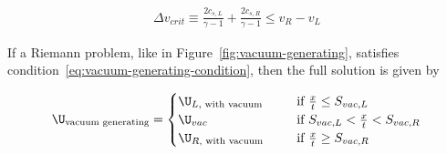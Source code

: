 \begin{align}
    \Delta v_{crit} \equiv \frac{2 c_{s,L}}{\gamma - 1 } + \frac{2 c_{s,R}}{\gamma - 1 } \leq v_R -
v_L \label{eq:vacuum-generating-condition}
\end{align}

If a Riemann problem, like in Figure~\ref{fig:vacuum-generating}, satisfies
condition~\ref{eq:vacuum-generating-condition}, then the full solution is given by

\begin{align}
    \U_{\text{vacuum generating}} =
        \begin{cases}
            \U_{L, \text{ with vacuum }} & \quad \text{ if } \frac{x}{t} \leq S_{vac, L}\\
            \U_{vac} & \quad \text{ if } S_{vac, L} < \frac{x}{t} <  S_{vac, R}\\
            \U_{R, \text{ with vacuum }} & \quad \text{ if } \frac{x}{t} \geq S_{vac, R} \\
        \end{cases}
\end{align}






